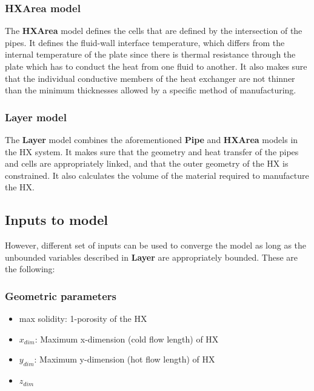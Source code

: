 \documentclass{article}
\begin{document}
\subsubsection{\textbf{HXArea} model}

The \textbf{HXArea} model defines the cells that are defined by the intersection of the pipes. It defines the fluid-wall interface temperature, which differs from the internal temperature of the plate since there is thermal resistance through the plate which has to conduct the heat from one fluid to another. It also makes sure that the individual conductive members of the heat exchanger are not thinner than the minimum thicknesses allowed by a specific method of manufacturing. 


\subsubsection{\textbf{Layer} model}

The \textbf{Layer} model combines the aforementioned \textbf{Pipe} and \textbf{HXArea} models in the HX system. It makes sure that the geometry and heat transfer of the pipes and cells are appropriately linked, and that the outer geometry of the HX is constrained. It also calculates the volume of the material required to manufacture the HX.

\subsection{Inputs to model}

However, different set of inputs can be used to converge the model as long as the unbounded variables described in \textbf{Layer} are appropriately bounded. These are the following:


\subsubsection{Geometric parameters}
\begin{itemize}
\item max solidity: 1-porosity of the HX
\item $x_{dim}$: Maximum x-dimension (cold flow length) of HX
\item $y_{dim}$: Maximum y-dimension (hot flow length) of HX
\item $z_{dim}$
\end{itemize}
\end{document}
